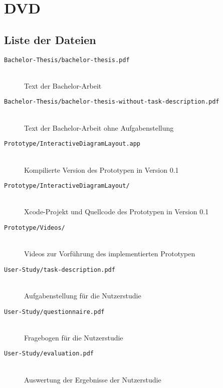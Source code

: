 
\chapter{DVD}
\label{chapter:dvd}

\section{Liste der Dateien}

\begin{description}
    \item[\texttt{Bachelor-Thesis/bachelor-thesis.pdf}] 
        \hfill \\ Text der Bachelor-Arbeit
    \item[\texttt{Bachelor-Thesis/bachelor-thesis-without-task-description.pdf}] 
        \hfill \\ Text der Bachelor-Arbeit ohne Aufgabenstellung
    \item[\texttt{Prototype/InteractiveDiagramLayout.app}]
        \hfill \\ Kompilierte Version des Prototypen in Version 0.1
    \item[\texttt{Prototype/InteractiveDiagramLayout/}] 
        \hfill \\ Xcode-Projekt und 
Quellcode des Prototypen in Version 0.1
    \item[\texttt{Prototype/Videos/}] 
        \hfill \\ Videos zur Vorführung des implementierten Prototypen
    \item[\texttt{User-Study/task-description.pdf}] 
        \hfill \\ Aufgabenstellung für die Nutzerstudie
    \item[\texttt{User-Study/questionnaire.pdf}]
        \hfill \\ Fragebogen für die Nutzerstudie
    \item[\texttt{User-Study/evaluation.pdf}]
        \hfill \\ Auswertung der Ergebnisse der Nutzerstudie
\end{description}
